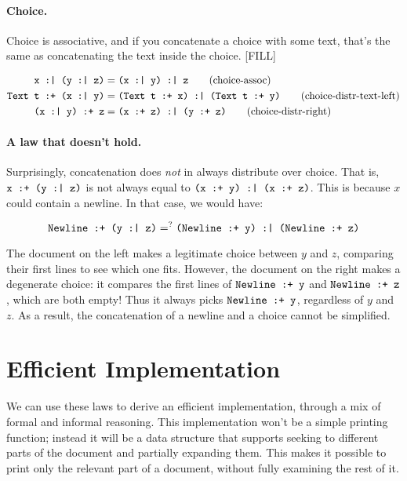 \documentclass{article}
\newcommand{\cat}[2]{\texttt{#1 :+ #2}}
\newcommand{\choice}[2]{\texttt{#1 :| #2}}
\newcommand{\txt}[1]{\texttt{Text #1}}
\newcommand{\nl}{\texttt{Newline}}
\begin{document}
\paragraph{Choice.}
Choice is associative, and if you concatenate a choice with some text, that's the same as
concatenating the text inside the choice. [FILL]

\begin{align*}
  \choice{x}{(\choice{y}{z})} &= \choice{(\choice{x}{y})}{z}
    \tag{choice-assoc} \\
  \cat{\txt{t}}{(\choice{x}{y})} &= \choice{(\cat{\txt{t}}{x})}{(\cat{\txt{t}}{y})}
    \tag{choice-distr-text-left} \\
  \cat{(\choice{x}{y})}{z} &= \choice{(\cat{x}{z})}{(\cat{y}{z})}
    \tag{choice-distr-right}
\end{align*}

\paragraph{A law that doesn't hold.}
Surprisingly, concatenation does \emph{not} in always distribute over choice. That is,
$\cat{x}{(\choice{y}{z})}$ is not always equal to $\choice{(\cat{x}{y})}{(\cat{x}{z})}$.  This is
because $x$ could contain a newline. In that case, we would have:

\[ \cat{\nl}{(\choice{y}{z})} =^? \choice{(\cat{\nl}{y})}{(\cat{\nl}{z})} \]

The document on the left makes a legitimate choice between $y$ and $z$, comparing their first lines
to see which one fits. However, the document on the right makes a degenerate choice: it compares the
first lines of $\cat{\nl}{y}$ and $\cat{\nl}{z}$, which are both empty! Thus it always picks
$\cat{\nl}{y}$, regardless of $y$ and $z$.  As a result, the concatenation of a newline and a choice
cannot be simplified.

\section{Efficient Implementation}

We can use these laws to derive an efficient implementation, through a mix of formal and informal
reasoning. This implementation won't be a simple printing function; instead it will be a data
structure that supports seeking to different parts of the document and partially expanding them.
This makes it possible to print only the relevant part of a document, without fully examining the
rest of it.
\end{document}
